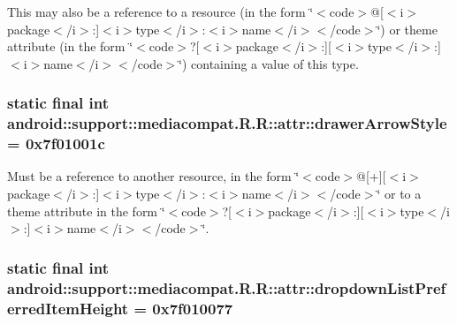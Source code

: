 This may also be a reference to a resource (in the form \char`\"{}$<$code$>$@\mbox{[}$<$i$>$package$<$/i$>$:\mbox{]}$<$i$>$type$<$/i$>$:$<$i$>$name$<$/i$>$$<$/code$>$\char`\"{}) or theme attribute (in the form \char`\"{}$<$code$>$?\mbox{[}$<$i$>$package$<$/i$>$:\mbox{]}\mbox{[}$<$i$>$type$<$/i$>$:\mbox{]}$<$i$>$name$<$/i$>$$<$/code$>$\char`\"{}) containing a value of this type. \hypertarget{classandroid_1_1support_1_1mediacompat_1_1_r_1_1attr_0527364a7137f5bc3eb90d39258ab05f}{
\subsubsection[{drawerArrowStyle}]{\setlength{\rightskip}{0pt plus 5cm}static final int android::support::mediacompat.R.R::attr::drawerArrowStyle = 0x7f01001c}}
\label{classandroid_1_1support_1_1mediacompat_1_1_r_1_1attr_0527364a7137f5bc3eb90d39258ab05f}


Must be a reference to another resource, in the form \char`\"{}$<$code$>$@\mbox{[}+\mbox{]}\mbox{[}$<$i$>$package$<$/i$>$:\mbox{]}$<$i$>$type$<$/i$>$:$<$i$>$name$<$/i$>$$<$/code$>$\char`\"{} or to a theme attribute in the form \char`\"{}$<$code$>$?\mbox{[}$<$i$>$package$<$/i$>$:\mbox{]}\mbox{[}$<$i$>$type$<$/i$>$:\mbox{]}$<$i$>$name$<$/i$>$$<$/code$>$\char`\"{}. \hypertarget{classandroid_1_1support_1_1mediacompat_1_1_r_1_1attr_6f22be7dafb268aa0674d4fde52386f7}{
\subsubsection[{dropdownListPreferredItemHeight}]{\setlength{\rightskip}{0pt plus 5cm}static final int android::support::mediacompat.R.R::attr::dropdownListPreferredItemHeight = 0x7f010077}}
\label{classandroid_1_1support_1_1mediacompat_1_1_r_1_1attr_6f22be7dafb268aa0674d4fde52386f7}


